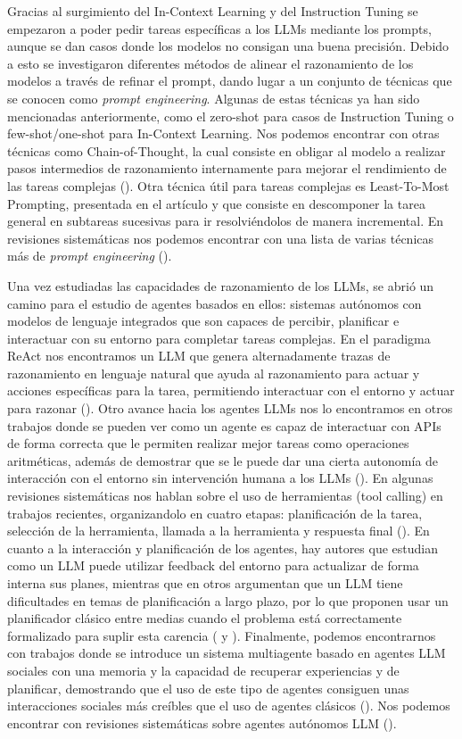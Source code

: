 Gracias al surgimiento del In-Context Learning y del Instruction Tuning se empezaron a poder pedir tareas específicas a los LLMs mediante los prompts, aunque se dan casos donde los modelos no consigan una buena precisión.
Debido a esto se investigaron diferentes métodos de alinear el razonamiento de los modelos a través de refinar el prompt, dando lugar a un conjunto de técnicas que se conocen como \textit{prompt engineering}.
Algunas de estas técnicas ya han sido mencionadas anteriormente, como el zero-shot para casos de Instruction Tuning o few-shot/one-shot para In-Context Learning.
Nos podemos encontrar con otras técnicas como Chain-of-Thought, la cual consiste en obligar al modelo a realizar pasos intermedios de razonamiento internamente para mejorar el rendimiento de las tareas complejas (\cite{CoT}).
Otra técnica útil para tareas complejas es Least-To-Most Prompting, presentada en el artículo \cite{LtM} y que consiste en descomponer la tarea general en subtareas sucesivas para ir resolviéndolos de manera incremental.
En revisiones sistemáticas nos podemos encontrar con una lista de varias técnicas más de \textit{prompt engineering} (\cite{RevisionPE}).

Una vez estudiadas las capacidades de razonamiento de los LLMs, se abrió un camino para el estudio de agentes basados en ellos: sistemas autónomos con modelos de lenguaje integrados que son capaces de percibir, planificar e interactuar con su entorno para completar tareas complejas.
En el paradigma ReAct nos encontramos un LLM que genera alternadamente trazas de razonamiento en lenguaje natural que ayuda al razonamiento para actuar y acciones específicas para la tarea, permitiendo interactuar con el entorno y actuar para razonar (\cite{ReAct}).
Otro avance hacia los agentes LLMs nos lo encontramos en otros trabajos donde se pueden ver como un agente es capaz de interactuar con APIs de forma correcta que le permiten realizar mejor tareas como operaciones aritméticas, además de demostrar que se le puede dar una cierta autonomía de interacción con el entorno sin intervención humana a los LLMs (\cite{Toolformer}).
En algunas revisiones sistemáticas nos hablan sobre el uso de herramientas (tool calling) en trabajos recientes, organizandolo en cuatro etapas: planificación de la tarea, selección de la herramienta, llamada a la herramienta y respuesta final (\cite{ToolCallingRev}).
En cuanto a la interacción y planificación de los agentes, hay autores que estudian como un LLM puede utilizar feedback del entorno para actualizar de forma interna sus planes, mientras que en otros argumentan que un LLM tiene dificultades en temas de planificación a largo plazo, por lo que proponen usar un planificador clásico entre medias cuando el problema está correctamente formalizado para suplir esta carencia (\cite{InnerMonologue} y \cite{LLM+P}).
Finalmente, podemos encontrarnos con trabajos donde se introduce un sistema multiagente basado en agentes LLM sociales con una memoria y la capacidad de recuperar experiencias y de planificar, demostrando que el uso de este tipo de agentes consiguen unas interacciones sociales más creíbles que el uso de agentes clásicos (\cite{AgentesLLM}).
Nos podemos encontrar con revisiones sistemáticas sobre agentes autónomos LLM (\cite{AgentesRev}).

